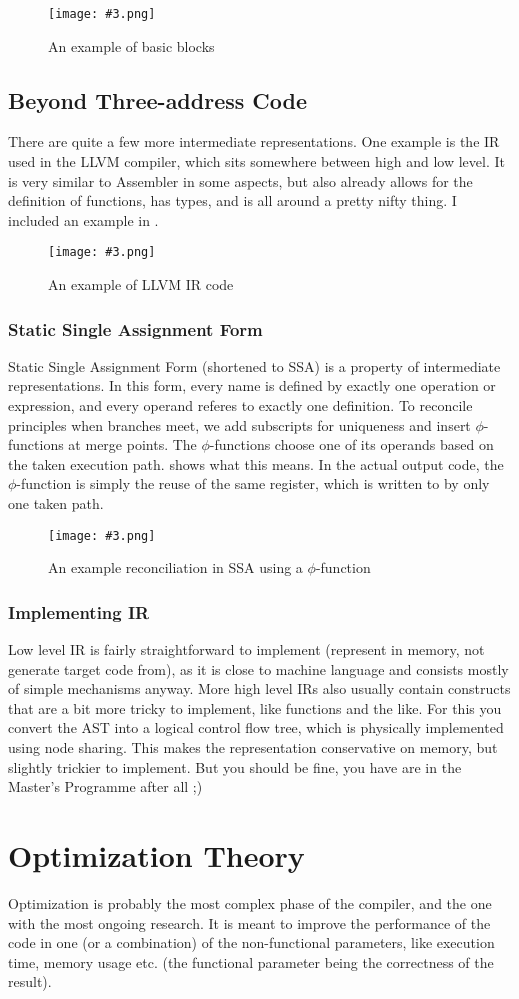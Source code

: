 \documentclass{article}
\newcommand{\fig}[4]{
	\begin{figure}[#1]
		\center
		\texttt{[image: \#3.png]}
		\caption{#4}
		\label{fig:#3}
	\end{figure}
	}
\begin{document}
\fig{h}{}{bbs}{An example of basic blocks}

\subsection{Beyond Three-address Code}
There are quite a few more intermediate representations.
One example is the IR used in the LLVM compiler, which sits somewhere between high and low level.
It is very similar to Assembler in some aspects, but also already allows for the definition of functions, has types, and is all around a pretty nifty thing.
I included an example in .

\fig{h}{}{llvm}{An example of LLVM IR code}

\subsubsection{Static Single Assignment Form}
Static Single Assignment Form (shortened to SSA) is a property of intermediate representations.
In this form, every name is defined by exactly one operation or expression, and every operand referes to exactly one definition.
To reconcile principles when branches meet, we add subscripts for uniqueness and insert $\phi$-functions at merge points.
The $\phi$-functions choose one of its operands based on the taken execution path.
 shows what this means.
In the actual output code, the $\phi$-function is simply the reuse of the same register, which is written to by only one taken path.

\fig{h}{0.5}{ssa}{An example reconciliation in SSA using a $\phi$-function}

\subsubsection{Implementing IR}
Low level IR is fairly straightforward to implement (represent in memory, not generate target code from), as it is close to machine language and consists mostly of simple mechanisms anyway.
More high level IRs also usually contain constructs that are a bit more tricky to implement, like functions and the like.
For this you convert the AST into a logical control flow tree, which is physically implemented using node sharing.
This makes the representation conservative on memory, but slightly trickier to implement.
But you should be fine, you have are in the Master's Programme after all ;)

\section{Optimization Theory}
Optimization is probably the most complex phase of the compiler, and the one with the most ongoing research.
It is meant to improve the performance of the code in one (or a combination) of the non-functional parameters, like execution time, memory usage etc. (the functional parameter being the correctness of the result).
\end{document}
